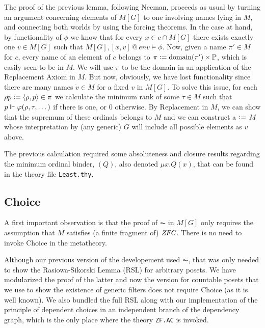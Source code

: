 The proof of the previous lemma, following Neeman, proceeds as usual
by turning an argument concerning elements of $M[G]$ to one involving
names lying in $M$, and connecting both worlds by using the forcing
theorems. In the case at hand, by functionality of $\phi$ we know that
for every $x\in c\cap M[G]$ there exists exactly one $v\in M[G]$ such
that
$M[G], [x,v]\mathbin{@} \mathit{env} \models \phi$. Now,
given a name $\pi'\in M$ for $c$, every name of an element of $c$
belongs to $\pi\mathrel{\mathop:}= \operatorname{domain}(\pi')\times \mathbb{P}$, which is easily seen to be
in $M$. We will use $\pi$ to be the domain in an application of the
Replacement Axiom in $M$. But now, obviously, we have lost
functionality since there are many names $\dot v\in M$ for a fixed $v$
in $M[G]$. To solve this issue, for each $\rho p \mathrel{\mathop:}=\langle\rho,p\rangle\in
\pi$ we calculate the
minimum rank of some $\tau\in M$ such that 
$p\Vdash \varphi(\rho,\tau,\dots)$ if there is one, or $0$ otherwise. By
Replacement in $M$, we can show that the supremum  of these ordinals
belongs to $M$ and we can construct a  $\mathrel{\mathop:}=$ 
$M$
whose interpretation by (any generic) $G$ will include all possible elements
as $v$ above.

The previous calculation required some absoluteness and closure
results regarding the minimum ordinal binder, $(Q)$, also
denoted $\mu x. Q(x)$, that can be found in the theory file
\verb|Least.thy|.

\subsection{Choice}
A first important observation is that the proof of $\AC$ in $M[G]$
only requires the assumption that $M$ satisfies (a finite fragment of)
$\mathit{ZFC}$. There is no need to invoke Choice in the metatheory.

Although our previous version of the developement used $\AC$, that was
only needed to show the Rasiowa-Sikorski Lemma (RSL) for
arbitrary posets. We have modularized the proof of the latter
and now the version for countable posets that we use to show the
existence of generic filters
does not require Choice (as it is well known). We also bundled the
full RSL along with our implementation of the principle of dependent
choices in an independent branch of the dependency graph, which is the
only place where the theory \texttt{ZF.AC} is invoked.

